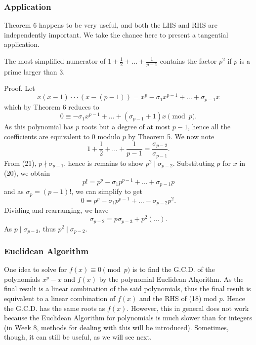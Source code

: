 \documentclass{article}
\begin{document}
\subsubsection{Application}
Theorem 6 happens to be very useful, and both the LHS and RHS are independently important. We take the chance here to present a tangential application.
\begin{thm}[Wolstenholme]
    The most simplified numerator of $1 + \frac{1}{2} + ... + \frac{1}{p-1}$ contains the factor $p^{2}$ if $p$ is a prime larger than 3.
\end{thm}
Proof. Let
\begin{equation}
        x(x-1)\cdot \cdot \cdot (x-(p-1))        =  x^{p} - \sigma_{1}x^{p-1} + ... + \sigma_{p-1}x
\end{equation}
which by Theorem 6 reduces to
\begin{equation}
    0 \equiv - \sigma_{1}x^{p-1} + ... + (\sigma_{p-1}+1)x \pmod{p}.
\end{equation}
As this polynomial has $p$ roots but a degree of at most $p-1$, hence all the coefficients are equivalent to 0 modulo $p$ by Theorem 5. We now note
\begin{equation}
    1 + \frac{1}{2} + ... + \frac{1}{p-1} = \frac{\sigma_{p-2}}{\sigma_{p-1}}.
\end{equation}
From (21), $p \nmid \sigma_{p-1}$, hence is remains to show $p^{2} \mid \sigma_{p-2}$. Substituting $p$ for $x$ in (20), we obtain
\begin{equation}
    p! = p^{p} - \sigma_{1}p^{p-1} + ... + \sigma_{p-1}p
\end{equation}
and as $\sigma_{p} = (p-1)!$, we can simplify to get
\begin{equation}
    0 = p^{p} - \sigma_{1}p^{p-1} +... - \sigma_{p-2}p^2.
\end{equation}
Dividing and rearranging, we have
\begin{equation}
    \sigma_{p-2} = p\sigma_{p-3} + p^{2}(...).
\end{equation}
As $p \mid \sigma_{p-3}$, thus $p^{2} \mid \sigma_{p-2}$.

\subsubsection{Euclidean Algorithm}
One idea to solve for $f(x) \equiv 0 \pmod{p}$ is to find the G.C.D. of the polynomials $x^{p}-x$ and $f(x)$ by the polynomial Euclidean Algorithm. As the final result is a linear combination of the said polynomials, thus the final result is equivalent to a linear combination of $f(x)$ and the RHS of (18) mod $p$. Hence the G.C.D. has the same roots as $f(x)$. However, this in general does not work because the Euclidean Algorithm for polynomials is much slower than for integers (in Week 8, methods for dealing with this will be introduced). Sometimes, though, it can still be useful, as we will see next.
\end{document}
